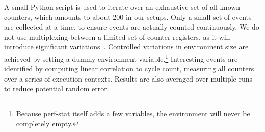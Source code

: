 \documentclass[10pt, conference, compsocconf]{IEEEtran}
\begin{document}
A small Python script is used to iterate over an exhaustive set of all known counters, which amounts to about 200 in our setups.
Only a small set of events are collected at a time, to ensure events are actually counted continuously.
We do not use multiplexing between a limited set of counter registers, as it will introduce significant variations~\cite{Wiplove:ImproveEstimation}. %
Controlled variations in environment size are achieved by setting a dummy environment variable.\footnote{Because perf-stat itself adds a few variables, the environment will never be completely empty.}
Interesting events are identified by computing linear correlation to cycle count, measuring all counters over a series of execution contexts.
Results are also averaged over multiple runs to reduce potential random error.%

\end{document}
